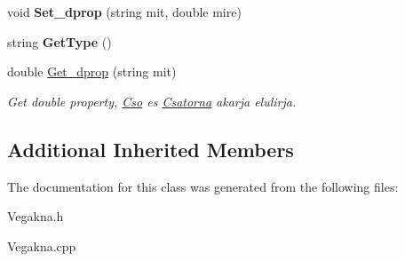 \begin{DoxyCompactItemize}
void {\bfseries Set\+\_\+dprop} (string mit, double mire)
\item 
\mbox{\label{class_vegakna_a623a4d644d9b76f48358738df22b9865}} 
string {\bfseries Get\+Type} ()
\item 
\mbox{\label{class_vegakna_a262a9880ff91b0d2f0cf3c6f28641913}} 
double \hyperlink{class_vegakna_a262a9880ff91b0d2f0cf3c6f28641913}{Get\+\_\+dprop} (string mit)
\begin{DoxyCompactList}\small\item\em Get double property, \hyperlink{class_cso}{Cso} es \hyperlink{class_csatorna}{Csatorna} akarja elulirja. \end{DoxyCompactList}\end{DoxyCompactItemize}
\subsection*{Additional Inherited Members}


The documentation for this class was generated from the following files\+:\begin{DoxyCompactItemize}
\item 
Vegakna.\+h\item 
Vegakna.\+cpp\end{DoxyCompactItemize}
